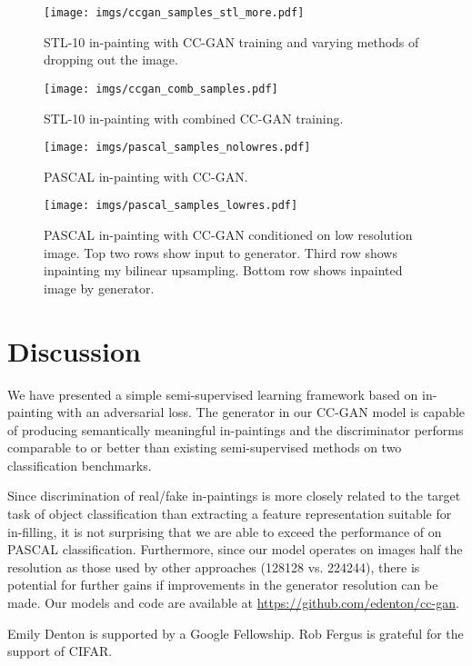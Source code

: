 \documentclass{article} \usepackage{iclr2017_conference,times}
\begin{document}
\vspace{10mm}

\begin{figure}[t!]
\centering
  \texttt{[image: imgs/ccgan\_samples\_stl\_more.pdf]} 
\caption{STL-10 in-painting with CC-GAN training and varying methods of dropping out the image. }
\label{fig:ccgan_samples}
\vspace{2mm}
\end{figure}

\begin{figure}[t!]
\centering
  \texttt{[image: imgs/ccgan\_comb\_samples.pdf]} 
\caption{STL-10 in-painting with combined CC-GAN training. }
\vspace{2mm}
\label{fig:ccgan_comb_samples}
\end{figure}

\begin{figure}[t!]
\centering
  \texttt{[image: imgs/pascal\_samples\_nolowres.pdf]} 
\caption{PASCAL in-painting with CC-GAN.}
\vspace{2mm}
\label{fig:pascal_samples_nolowres}
\end{figure}

\begin{figure}[t!]
\centering
  \texttt{[image: imgs/pascal\_samples\_lowres.pdf]} 
\caption{PASCAL in-painting with CC-GAN conditioned on low resolution image. Top two rows show input to generator. Third row shows inpainting my bilinear upsampling. Bottom row shows inpainted image by generator. }
\label{fig:pascal_samples}
\end{figure}



 
\section{Discussion}
We have presented a simple semi-supervised learning framework based on
in-painting with an adversarial loss.  The generator in our CC-GAN
model is capable of producing semantically meaningful in-paintings and
the discriminator performs comparable to or better than existing
semi-supervised methods on two classification benchmarks.

Since discrimination of real/fake in-paintings is more closely related
to the target task of object classification than extracting a feature
representation suitable for in-filling, it is not surprising that we
are able to exceed the performance of \cite{pathak2016}
on PASCAL classification.  Furthermore, since our model operates on
images half the resolution as those used by other approaches
(128128 vs. 224244), there is potential for further
gains if improvements in the generator resolution can be made. Our models and code are available at \url{https://github.com/edenton/cc-gan}.


 Emily Denton is supported by a
Google Fellowship. Rob Fergus is grateful for the support of CIFAR.

\small
 

\end{document}
